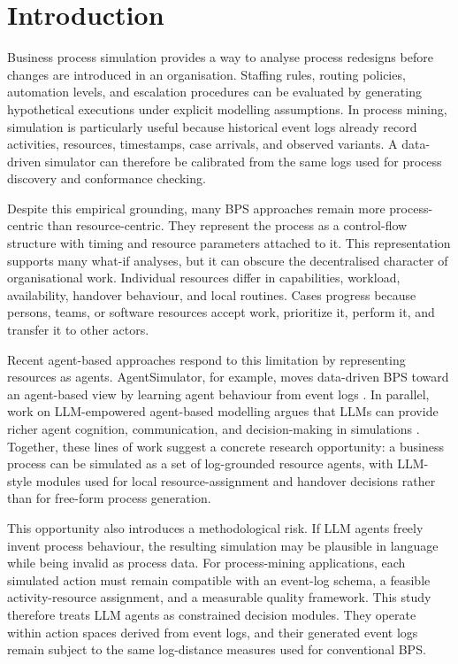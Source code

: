 \section{Introduction}\label{introduction}

Business process simulation provides a way to analyse process redesigns
before changes are introduced in an organisation. Staffing rules,
routing policies, automation levels, and escalation procedures can be
evaluated by generating hypothetical executions under explicit modelling
assumptions. In process mining, simulation is particularly useful
because historical event logs already record activities, resources,
timestamps, case arrivals, and observed variants. A data-driven
simulator can therefore be calibrated from the same logs used for
process discovery and conformance checking.

Despite this empirical grounding, many BPS approaches remain more
process-centric than resource-centric. They represent the process as a
control-flow structure with timing and resource parameters attached to
it. This representation supports many what-if analyses, but it can
obscure the decentralised character of organisational work. Individual
resources differ in capabilities, workload, availability, handover
behaviour, and local routines. Cases progress because persons, teams, or
software resources accept work, prioritize it, perform it, and transfer
it to other actors.

Recent agent-based approaches respond to this limitation by representing
resources as agents. AgentSimulator, for example, moves data-driven BPS
toward an agent-based view by learning agent behaviour from event logs
\cite{kirchdorfer2024agentsimulator}. In parallel, work on
LLM-empowered agent-based modelling argues that LLMs can provide richer
agent cognition, communication, and decision-making in simulations
\cite{gao2024llmabm}. Together, these lines of work suggest a concrete
research opportunity: a business process can be simulated as a set of
log-grounded resource agents, with LLM-style modules used for local
resource-assignment and handover decisions rather than for free-form
process generation.

This opportunity also introduces a methodological risk. If LLM agents
freely invent process behaviour, the resulting simulation may be
plausible in language while being invalid as process data. For
process-mining applications, each simulated action must remain
compatible with an event-log schema, a feasible activity-resource
assignment, and a measurable quality framework. This study therefore
treats LLM agents as constrained decision modules. They operate within
action spaces derived from event logs, and their generated event logs
remain subject to the same log-distance measures used for conventional
BPS.

